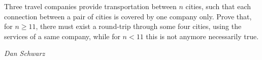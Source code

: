 Three travel companies provide transportation between $n$ cities, such that each connection between a pair of cities is covered by one company only. Prove that, for $n \geq 11$, there must exist a round-trip through some four cities, using the services of a same company,  while for $n < 11$ this is not anymore necessarily true.

\textit{Dan Schwarz}